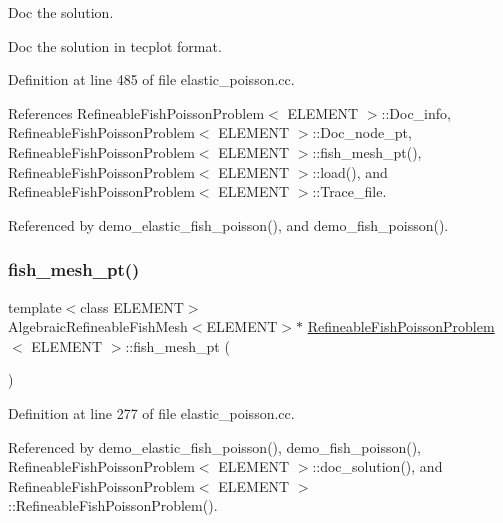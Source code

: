 Doc the solution. 

Doc the solution in tecplot format. 

Definition at line 485 of file elastic\+\_\+poisson.\+cc.



References Refineable\+Fish\+Poisson\+Problem$<$ E\+L\+E\+M\+E\+N\+T $>$\+::\+Doc\+\_\+info, Refineable\+Fish\+Poisson\+Problem$<$ E\+L\+E\+M\+E\+N\+T $>$\+::\+Doc\+\_\+node\+\_\+pt, Refineable\+Fish\+Poisson\+Problem$<$ E\+L\+E\+M\+E\+N\+T $>$\+::fish\+\_\+mesh\+\_\+pt(), Refineable\+Fish\+Poisson\+Problem$<$ E\+L\+E\+M\+E\+N\+T $>$\+::load(), and Refineable\+Fish\+Poisson\+Problem$<$ E\+L\+E\+M\+E\+N\+T $>$\+::\+Trace\+\_\+file.



Referenced by demo\+\_\+elastic\+\_\+fish\+\_\+poisson(), and demo\+\_\+fish\+\_\+poisson().

\mbox{\label{classRefineableFishPoissonProblem_a6f25d5110e5262e66e2900da051567a6}} 
\subsubsection{\texorpdfstring{fish\+\_\+mesh\+\_\+pt()}{fish\_mesh\_pt()}}
{\footnotesize\ttfamily template$<$class E\+L\+E\+M\+E\+NT$>$ \\
Algebraic\+Refineable\+Fish\+Mesh$<$E\+L\+E\+M\+E\+NT$>$$\ast$ \hyperlink{classRefineableFishPoissonProblem}{Refineable\+Fish\+Poisson\+Problem}$<$ E\+L\+E\+M\+E\+NT $>$\+::fish\+\_\+mesh\+\_\+pt (\begin{DoxyParamCaption}{ }\end{DoxyParamCaption})\hspace{0.3cm}{\ttfamily [inline]}}



Definition at line 277 of file elastic\+\_\+poisson.\+cc.



Referenced by demo\+\_\+elastic\+\_\+fish\+\_\+poisson(), demo\+\_\+fish\+\_\+poisson(), Refineable\+Fish\+Poisson\+Problem$<$ E\+L\+E\+M\+E\+N\+T $>$\+::doc\+\_\+solution(), and Refineable\+Fish\+Poisson\+Problem$<$ E\+L\+E\+M\+E\+N\+T $>$\+::\+Refineable\+Fish\+Poisson\+Problem().

